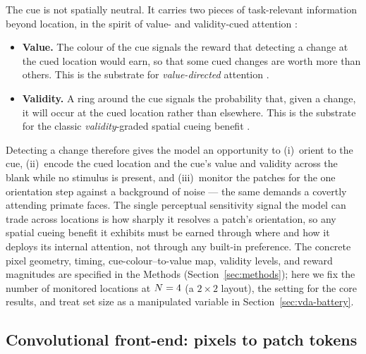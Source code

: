 The cue is not spatially neutral. It carries two pieces of task-relevant
information beyond location, in the spirit of value- and validity-cued
attention \cite{carrasco2011_visual_attention_25y}:
\begin{itemize}
\item \textbf{Value.} The colour of the cue signals the reward that
  detecting a change at the cued location would earn, so that some cued
  changes are worth more than others. This is the substrate for
  \emph{value-directed} attention \cite{failing_theeuwes2018_selection_history,
  hickey2010_reward_salience_acc}.
\item \textbf{Validity.} A ring around the cue signals the probability
  that, given a change, it will occur at the cued location rather than
  elsewhere. This is the substrate for the classic \emph{validity}-graded
  spatial cueing benefit \cite{posner1980_orienting, MullerFindlay1987}.
\end{itemize}
Detecting a change therefore gives the model an opportunity to (i)~orient to the cue,
(ii)~encode the cued location and the cue's value and validity across the
blank while no stimulus is present, and (iii)~monitor the patches for the
one orientation step against a background of noise --- the same demands a
covertly attending primate faces. The single perceptual sensitivity
signal the model can trade across locations is how sharply it resolves a
patch's orientation, so any spatial cueing benefit it exhibits must be
earned through where and how it deploys its internal attention, not
through any built-in preference. The concrete pixel geometry, timing,
cue-colour--to-value map, validity levels, and reward magnitudes are
specified in the Methods (Section~\ref{sec:methods}); here we fix the
number of monitored locations at $N = 4$ (a $2\times2$ layout), the
setting for the core results, and treat set size as a manipulated
variable in Section~\ref{sec:vda-battery}.

\subsection{Convolutional front-end: pixels to patch tokens}
\label{sec:model-frontend}

